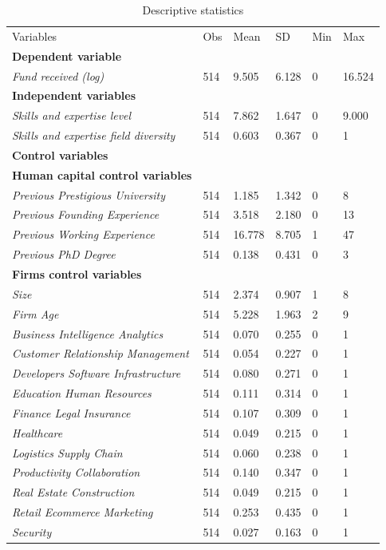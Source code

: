 \documentclass[12pt]{article}
\begin{document}
\begin{table} [ht]
\scriptsize
\renewcommand{\arraystretch}{1.5}
\begin{tabularx}{\textwidth}{ p{4.9cm} p{1.6cm} p{1.6cm} p{1.6cm} p{1.6cm} p{1.6cm} }
\toprule
\multicolumn{1}{l}{Variables}&\multicolumn{1}{l}{Obs}&\multicolumn{1}{l}{Mean}&\multicolumn{1}{l}{SD}&\multicolumn{1}{l}{Min}&\multicolumn{1}{l}{Max} \\
\cmidrule(r){1-6}
\textbf{Dependent variable} & & & & & \\
\textit{Fund received (log)} & 514 & 9.505 & 6.128 & 0 & 16.524 \\
\cmidrule(r){1-6}
\textbf{Independent variables} & & & & & \\
\textit{Skills and expertise level} & 514 & 7.862 & 1.647 & 0 & 9.000 \\
\textit{Skills and expertise field diversity} & 514 & 0.603 & 0.367 & 0 & 1 \\
\cmidrule(r){1-6}\textbf{Control variables} & & & & & \\
\textbf{Human capital control variables} & & & & & \\
\textit{Previous Prestigious University} & 514 & 1.185 & 1.342 & 0 & 8 \\
\textit{Previous Founding Experience} & 514 & 3.518 & 2.180 & 0 & 13 \\
\textit{Previous Working Experience} & 514 & 16.778 & 8.705 & 1 & 47 \\
\textit{Previous PhD Degree} & 514 & 0.138 & 0.431 & 0 & 3 \\
\cmidrule(r){1-6}
\textbf{Firms control variables} & & & & & \\
\textit{Size} & 514 & 2.374 & 0.907 & 1 & 8 \\
\textit{Firm Age} & 514 & 5.228 & 1.963 & 2 & 9 \\
\textit{Business Intelligence Analytics} & 514 & 0.070 & 0.255 & 0 & 1 \\
\textit{Customer Relationship Management} & 514 & 0.054 & 0.227 & 0 & 1 \\
\textit{Developers Software Infrastructure} & 514 & 0.080 & 0.271 & 0 & 1 \\
\textit{Education Human Resources} & 514 & 0.111 & 0.314 & 0 & 1 \\
\textit{Finance Legal Insurance} & 514 & 0.107 & 0.309 & 0 & 1 \\
\textit{Healthcare} & 514 & 0.049 & 0.215 & 0 & 1 \\
\textit{Logistics Supply Chain} & 514 & 0.060 & 0.238 & 0 & 1 \\
\textit{Productivity Collaboration} & 514 & 0.140 & 0.347 & 0 & 1 \\
\textit{Real Estate Construction} & 514 & 0.049 & 0.215 & 0 & 1 \\
\textit{Retail Ecommerce Marketing} & 514 & 0.253 & 0.435 & 0 & 1 \\
\textit{Security} & 514 & 0.027 & 0.163 & 0 & 1 \\
\end{tabularx}
\caption{Descriptive statistics}
\label{table2}
\end{table}
\end{document}

